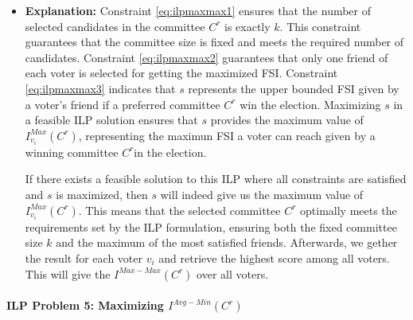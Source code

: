 \documentclass{article}
\begin{document}
\begin{itemize}
\item  \textbf{Explanation:}
Constraint \ref{eq:ilpmaxmax1} ensures that the number of selected candidates in the committee \(C^r\) is exactly \(k\). This constraint guarantees that the committee size is fixed and meets the required number of candidates.
Constraint \ref{eq:ilpmaxmax2} guarantees that only one friend of each voter is selected for getting the maximized FSI.
Constraint \ref{eq:ilpmaxmax3} indicates that \(s\) represents the upper bounded FSI given by a voter's friend if a preferred committee \(C^r\) win the election. Maximizing \(s\) in a feasible ILP solution ensures that \(s\) provides the maximum value of \(I_{v_i}^{Max}(C^{r})\), representing the maximun FSI a voter can reach given by a winning committee \(C^r\)in the election. 

If there exists a feasible solution to this ILP where all constraints are satisfied and \(s\) is maximized, then \(s\) will indeed give us the maximum value of \(I_{v_i}^{Max}(C^{r})\). This means that the selected committee \(C^r\) optimally meets the requirements set by the ILP formulation, ensuring both the fixed committee size \(k\) and the maximum of the most satisfied friends. Afterwards, we gether the result for each voter $v_i$ and retrieve the highest score among all voters. This will give the $I^{Max-Max}(C^{r})$ over all voters.

\end{itemize}


\paragraph*{ILP Problem 5: Maximizing  $I^{Avg-Min}(C^{r})$}
\end{document}
